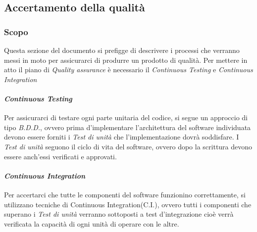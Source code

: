 \subsection{Accertamento della qualit\` a}
\subsubsection{Scopo}
Questa sezione del documento si prefigge di descrivere i processi che verranno
messi in moto per assicurarci di produrre un prodotto di qualità.
Per mettere in atto il piano di \textit{Quality assurance\glo} è necessario il
\textit{Continuous Testing\glo} e \textit{Continuous Integration\glo}

\paragraph{\textit{Continuous Testing\glo}}
Per assicurarci di testare ogni parte unitaria del codice, si segue un approccio
di tipo \textit{B.D.D.\glo}, ovvero prima d'implementare l'architettura del software
individuata devono essere forniti i \textit{Test di unità\glo} che l'implementazione dovrà soddisfare.
I \textit{Test di unità\glo} seguono il ciclo di vita del software, ovvero dopo la
scrittura devono essere anch'essi verificati e approvati.

\paragraph{\textit{Continuous Integration\glo}}
Per accertarci che tutte le componenti del software funzionino correttamente, si
utilizzano tecniche di Continuous Integration(C.I.), ovvero tutti i componenti che
superano i \textit{Test di unità\glo} verranno sottoposti a test d'integrazione
cioè verrà verificata la capacità di ogni unità di operare con le altre.
